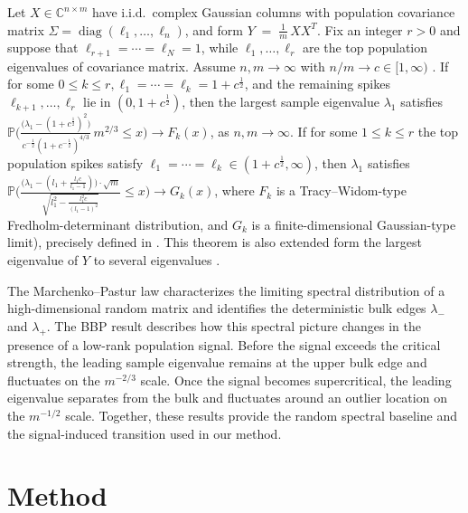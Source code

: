 \begin{theorem}
\label{thm:rmt2}
Let $X\in\mathbb{C}^{n\times m}$ have i.i.d.\ complex Gaussian columns with population covariance matrix $\Sigma=\operatorname{diag}(\ell_1,\dots,\ell_n)$, and form $Y \;=\; \frac{1}{m}\, X X^T$. Fix an integer $r> 0$ and suppose that $\ell_{r+1}=\cdots=\ell_N=1$, while $\ell_1,\dots,\ell_r$ are the  top population eigenvalues of covariance matrix. Assume $n,m\to\infty$ with $n/m\to c\in[1,\infty)$ . If for some $0\le k\le r,\ell_1=\cdots=\ell_k = 1+c^{\frac{1}{2}}$, and the remaining spikes $\ell_{k+1},\dots,\ell_r$ lie in $(0,1+c^{\frac{1}{2}})$, then the largest sample eigenvalue $\lambda_1$ satisfies $\mathbb{P}\!\Bigg( 
\frac{\big(\lambda_1-(1+c^{\frac{1}{2}})^2\big) }{c^{-\frac{1}{2}}(1+c^{-\frac{1}{2}})^{4/3}}\, m^{2/3} \le x \Bigg)
\rightarrow F_k(x)$,
as $n,m\to\infty$. If for some $1\le k\le r$ the top population spikes satisfy $\ell_1=\cdots=\ell_k \in (1+c^{\frac{1}{2}},\infty)$, then $\lambda_1$ satisfies  $\mathbb{P}\!\Bigg( 
\frac{\big(\lambda_1-(l_1+\frac{l_1c}{l_1-1})\big)\cdot\sqrt{m}}{\sqrt{l_1^2-\frac{l_1^2c}{(l_1-1)^2}}} \le x \Bigg)
\rightarrow G_k(x)$, where  $F_k$ is a Tracy–Widom-type Fredholm-determinant distribution, and  $G_k$ is a finite-dimensional  Gaussian-type limit), precisely defined in \cite{baik2005phase}. This theorem is also extended form the largest eigenvalue of $Y$ to several eigenvalues \cite{benaych2011eigenvalues}.
\end{theorem}

The Marchenko--Pastur law characterizes the limiting spectral distribution
of a high-dimensional random matrix and identifies the deterministic bulk
edges $\lambda_-$ and $\lambda_+$. The BBP result describes how this spectral
picture changes in the presence of a low-rank population signal. Before the
signal exceeds the critical strength, the leading sample eigenvalue remains
at the upper bulk edge and fluctuates on the $m^{-2/3}$ scale. Once the signal
becomes supercritical, the leading eigenvalue separates from the bulk and
fluctuates around an outlier location on the $m^{-1/2}$ scale. Together,
these results provide the random spectral baseline and the signal-induced
transition used in our method.




\section{Method}
\label{sec:method}

